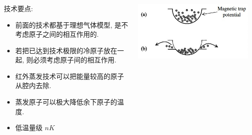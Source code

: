     \begin{frame} 
    \frametitle{}
    \begin{columns}
        \begin{column}[t]{0.58\linewidth}
    技术要点:
    \begin{itemize}
        \item 前面的技术都基于理想气体模型, 是不考虑原子之间的相互作用的.
        \item 若把已达到技术极限的冷原子放在一起, 则必须考虑原子间的相互作用. 
        \item 红外蒸发技术可以把能量较高的原子从腔内去除.
        \item 蒸发原子可以极大降低余下原子的温度.
        \item 低温量级 $nK$
    \end{itemize}
    \end{column}
    \begin{column}[t]{0.42\linewidth} 
        \begin{center}
            \includegraphics[width=1.0\textwidth]{figs/2022-05-30-16-50-58.png}
        \end{center}
    \end{column}
    \end{columns}   
    \end{frame}

